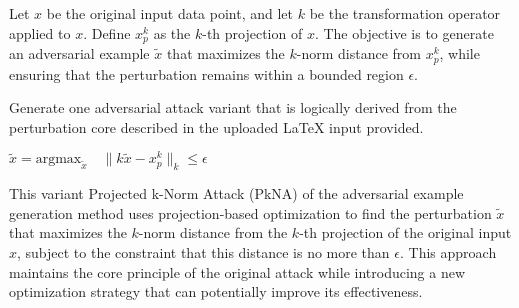 Let \( x \) be the original input data point, and let \( k \) be the transformation operator applied to \( x \). Define \( x^k_p \) as the \( k \)-th projection of \( x \). The objective is to generate an adversarial example \( \tilde{x} \) that maximizes the \( k \)-norm distance from \( x^k_p \), while ensuring that the perturbation remains within a bounded region \( \epsilon \).

Generate one adversarial attack variant that is logically derived from the perturbation core described in the uploaded LaTeX input provided.

$\tilde{x} = \text{argmax}_{\tilde{x}} \quad \| k\tilde{x} - x^k_p \|_k \leq \epsilon$

This variant Projected k-Norm Attack (PkNA) of the adversarial example generation method uses projection-based optimization to find the perturbation $\tilde{x}$ that maximizes the $k$-norm distance from the $k$-th projection of the original input $x$, subject to the constraint that this distance is no more than $\epsilon$. This approach maintains the core principle of the original attack while introducing a new optimization strategy that can potentially improve its effectiveness.